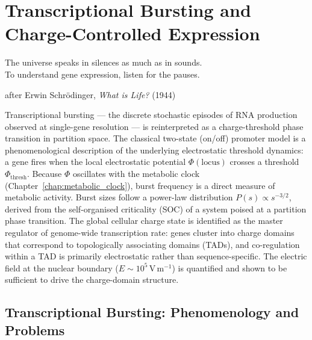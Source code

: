 
\chapter{Transcriptional Bursting and Charge-Controlled Expression}
\label{chap:transcriptional_bursting}

\epigraph{%
  The universe speaks in silences as much as in sounds.\\
  To understand gene expression, listen for the pauses.%
}{after Erwin Schr\"{o}dinger, \textit{What is Life?} (1944)}

\begin{chapterbox}
Transcriptional bursting --- the discrete stochastic episodes of RNA production
observed at single-gene resolution --- is reinterpreted as a charge-threshold
phase transition in partition space. The classical two-state (on/off) promoter
model is a phenomenological description of the underlying electrostatic
threshold dynamics: a gene fires when the local electrostatic potential
$\Phi(\text{locus})$ crosses a threshold $\Phi_{\mathrm{thresh}}$. Because
$\Phi$ oscillates with the metabolic clock (Chapter~\ref{chap:metabolic_clock}),
burst frequency is a direct measure of metabolic activity. Burst sizes follow a
power-law distribution $P(s) \propto s^{-3/2}$, derived from the self-organised
criticality (SOC) of a system poised at a partition phase transition. The global
cellular charge state is identified as the master regulator of genome-wide
transcription rate: genes cluster into charge domains that correspond to
topologically associating domains (TADs), and co-regulation within a TAD is
primarily electrostatic rather than sequence-specific. The electric field at
the nuclear boundary ($E \sim 10^5$\,V\,m$^{-1}$) is quantified and shown
to be sufficient to drive the charge-domain structure.
\end{chapterbox}

\section{Transcriptional Bursting: Phenomenology and Problems}
\label{sec:bursting_phenomenology}

